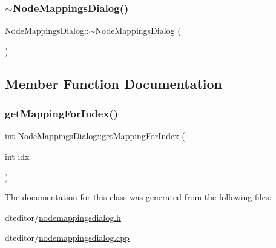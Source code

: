 \mbox{\label{class_node_mappings_dialog_ac67c07dccfdc38c20d831c4c1516261f}} 
\subsubsection{\texorpdfstring{$\sim$NodeMappingsDialog()}{~NodeMappingsDialog()}}
{\footnotesize\ttfamily Node\+Mappings\+Dialog\+::$\sim$\+Node\+Mappings\+Dialog (\begin{DoxyParamCaption}{ }\end{DoxyParamCaption})}



\subsection{Member Function Documentation}
\mbox{\label{class_node_mappings_dialog_aa7cbc1a671202f147e7e60468c231e31}} 
\subsubsection{\texorpdfstring{getMappingForIndex()}{getMappingForIndex()}}
{\footnotesize\ttfamily int Node\+Mappings\+Dialog\+::get\+Mapping\+For\+Index (\begin{DoxyParamCaption}\item[{int}]{idx }\end{DoxyParamCaption})}



The documentation for this class was generated from the following files\+:\begin{DoxyCompactItemize}
\item 
dteditor/\mbox{\hyperlink{nodemappingsdialog_8h}{nodemappingsdialog.\+h}}\item 
dteditor/\mbox{\hyperlink{nodemappingsdialog_8cpp}{nodemappingsdialog.\+cpp}}\end{DoxyCompactItemize}
